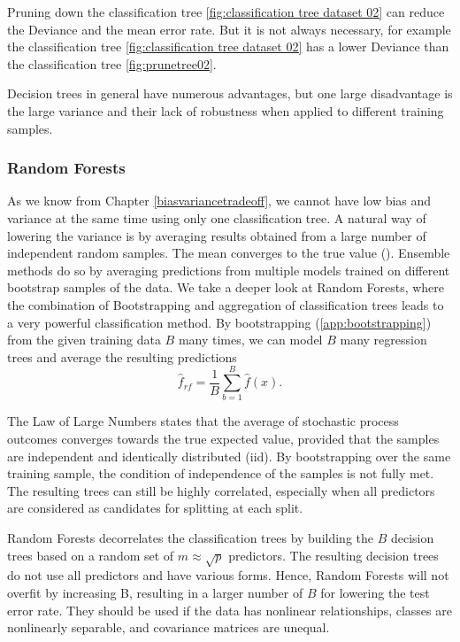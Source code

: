 \documentclass[12pt,a4paper,titlepage]{article}
\numberwithin{equation}{section}
\numberwithin{table}{section}
\numberwithin{figure}{section}
\begin{document}
        \noindent Pruning down the classification tree \ref{fig:classification tree dataset 02} can reduce the Deviance and the mean error rate. But it is not always necessary, for example the classification tree \ref{fig:classification tree dataset 02} has a lower Deviance than the classification tree \ref{fig:prunetree02}.
        
        \noindent Decision trees in general have numerous advantages, but one large disadvantage is the large variance and their lack of robustness when applied to different training samples.

        \subsubsection{Random Forests}\label{RandomForest}
        As we know from Chapter \ref{biasvariancetradeoff}, we cannot have low bias and variance at the same time using only one classification tree. A natural way of lowering the variance is by averaging results obtained from a large number of independent random samples. The mean converges to the true value (\cite{Lawoflargenumber}).
        Ensemble methods do so by averaging predictions from multiple models trained on different bootstrap samples of the data. We take a deeper look at Random Forests, where the combination of Bootstrapping and aggregation of classification trees leads to a very powerful classification method.
        By bootstrapping (\ref{app:bootstrapping}) from the given training data $B$ many times, we can model $B$ many regression trees and average the resulting predictions
        \begin{equation}
        \label{eq:Btimestree}
        \hat{f}_{rf} = \frac{1}{B} \sum^B_{b=1} \hat{f}(x).   
        \end{equation}
        
        \noindent The Law of Large Numbers states that the average of stochastic process outcomes converges towards the true expected value, provided that the samples are independent and identically distributed (iid). By bootstrapping over the same training sample, the condition of independence of the samples is not fully met. The resulting trees can still be highly correlated, especially when all predictors are considered as candidates for splitting at each split. 
        
        \noindent Random Forests decorrelates the classification trees by building the $B$ decision trees based on a random set of $m \approx \sqrt{p}$ predictors. The resulting decision trees do not use all predictors and have various forms.
        Hence, Random Forests will not overfit by increasing B, resulting in a larger number of $B$ for lowering the test error rate. They should be used if the data has nonlinear relationships, classes are nonlinearly separable, and covariance matrices are unequal.
    
\end{document}
